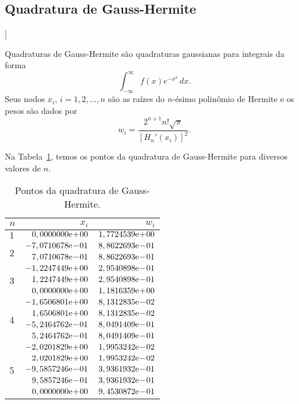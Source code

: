 \subsection{Quadratura de Gauss-Hermite}

\begin{flushleft}
  [[tag:revisar]]
\end{flushleft}

Quadraturas de Gauss-Hermite são quadraturas gaussianas para integrais da forma
\begin{equation}
  \int_{-\infty}^\infty f(x)e^{-x^2}\,dx.
\end{equation}
Seus nodos $x_i$, $i=1, 2, \dotsc, n$ são as raízes do $n$-ésimo polinômio de Hermite e os pesos são dados por
\begin{equation}
  w_i = \frac{2^{n+1}n!\sqrt{\pi}}{[H_n'(x_i)]^2}.
\end{equation}

Na Tabela~\ref{tab:quad_GH}, temos os pontos da quadratura de Gauss-Hermite para diversos valores de $n$.

\begin{table}[h!]
  \centering
  \caption{Pontos da quadratura de Gauss-Hermite.}
  \begin{tabular}{lrr}
    $n$ & $x_i$ & $w_i$ \\\hline
    $1$ & $0,0000000\mathrm{e}\!+\!00$ & $1,7724539\mathrm{e}\!+\!00$ \\
    \multirow{2}{*}{2}
    & $-7,0710678\mathrm{e}\!-\!01$ & $8,8622693\mathrm{e}\!-\!01$ \\
    & $7,0710678\mathrm{e}\!-\!01$ & $8,8622693\mathrm{e}\!-\!01$ \\\hline
    \multirow{3}{*}{3}
    & $-1,2247449\mathrm{e}\!+\!00$ & $2,9540898\mathrm{e}\!-\!01$ \\
    & $1,2247449\mathrm{e}\!+\!00$ & $2,9540898\mathrm{e}\!-\!01$ \\
    & $0,0000000\mathrm{e}\!+\!00$ & $1,1816359\mathrm{e}\!+\!00$ \\\hline
    \multirow{4}{*}{4}
    & $-1,6506801\mathrm{e}\!+\!00$ & $8,1312835\mathrm{e}\!-\!02$ \\
    & $1,6506801\mathrm{e}\!+\!00$ & $8,1312835\mathrm{e}\!-\!02$ \\
    & $-5,2464762\mathrm{e}\!-\!01$ & $8,0491409\mathrm{e}\!-\!01$ \\
    & $5,2464762\mathrm{e}\!-\!01$ & $8,0491409\mathrm{e}\!-\!01$ \\\hline
    \multirow{5}{*}{5}
    & $-2,0201829\mathrm{e}\!+\!00$ & $1,9953242\mathrm{e}\!-\!02$ \\
    & $2,0201829\mathrm{e}\!+\!00$ & $1,9953242\mathrm{e}\!-\!02$ \\
    & $-9,5857246\mathrm{e}\!-\!01$ & $3,9361932\mathrm{e}\!-\!01$ \\
    & $9,5857246\mathrm{e}\!-\!01$ & $3,9361932\mathrm{e}\!-\!01$ \\
    & $0,0000000\mathrm{e}\!+\!00$ & $9,4530872\mathrm{e}\!-\!01$ \\\hline
  \end{tabular}
  \label{tab:quad_GH}
\end{table}

